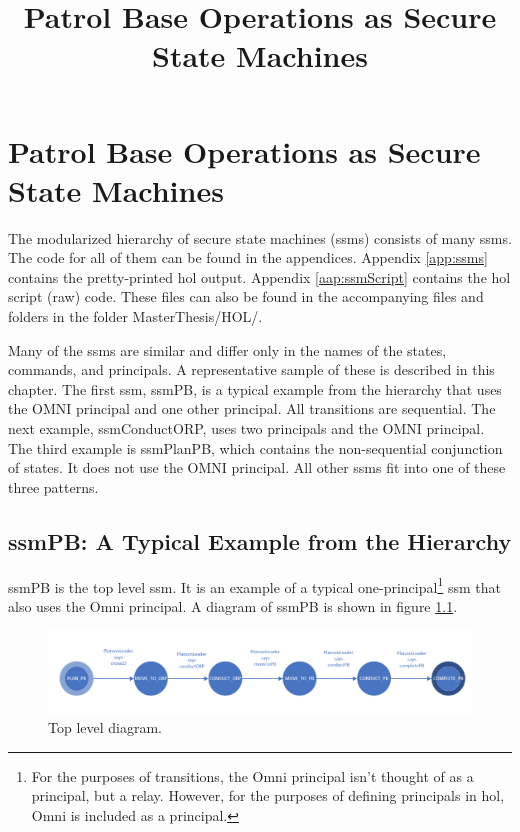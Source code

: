 \documentclass[../../main/main.tex]{subfiles}
\begin{document}
\title{Patrol Base Operations as Secure State Machines}


\chapter{Patrol Base Operations as Secure State Machines} \label{chp:pbssm}
The modularized hierarchy of secure state machines (\glspl{ssm}) consists of many \glspl{ssm}.  The code for all of them can be found in the appendices.  Appendix \ref{app:ssms} contains the pretty-printed \gls{hol} output.  Appendix \ref{aap:ssmScript} contains the \gls{hol} script (raw) code.  These files can also be found in the accompanying files and folders in the folder MasterThesis/HOL/.

Many of the \glspl{ssm} are similar and differ only in the names of the states, commands, and principals.  A representative sample of these is described in this chapter.  The first \gls{ssm}, ssmPB, is a typical example from the hierarchy that uses the OMNI principal and one other principal.  All transitions are sequential.  The next example, ssmConductORP, uses two principals and the OMNI principal.  The third example is ssmPlanPB, which contains the non-sequential conjunction of states.  It does not use the OMNI principal.  All other \glspl{ssm} fit into one of these three patterns.

\section{ssmPB: A Typical Example from the Hierarchy}\label{sec:ssmpb}
ssmPB is the top level \gls{ssm}.  It is an example of a typical one-principal\footnote{For the purposes of transitions, the Omni principal isn't thought of as a principal, but a relay.  However, for the purposes of defining principals in \gls{hol}, Omni is included as a principal.} \gls{ssm} that also uses the Omni principal.  A diagram of ssmPB is shown in figure \ref{ssmPBDiagram2}.


\begin{figure}[h!]
\centering
\includegraphics[width=\textwidth]{../figures/ssmPBDiagram}
\caption{\label{ssmPBDiagram2} Top level diagram.}
\end{figure}
\end{document}
